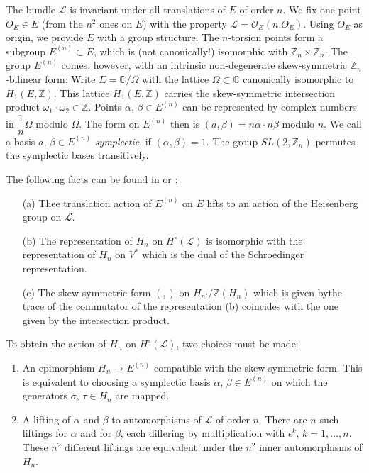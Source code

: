 The bundle $\mathscr{L}$ is invariant under all translations of $E$ of
order $n$. We fix one point $O_{E}\in E$ (from the $n^{2}$ ones on
$E$) with the property $\mathscr{L}=\mathscr{O}_{E}(n.O_{E})$. Using
$O_{E}$ as origin, we provide $E$ with a group structure. The
$n$-torsion points form a subgroup $E^{(n)}\subset E$, which is (not
canonically!) isomorphic with
$\mathbb{Z}_{n}\times \mathbb{Z}_{n}$. The group $E^{(n)}$ comes,
however, with an intrinsic non-degenerate skew-symmetric
$\mathbb{Z}_{n}$-bilinear form: Write $E=\mathbb{C}/\Omega$ with the
lattice $\Omega\subset \mathbb{C}$ canonically isomorphic to
$H_{1}(E,\mathbb{Z})$. This lattice $H_{1}(E,\mathbb{Z})$ carries the
skew-symmetric intersection product
$\omega_{1}\cdot \omega_{2}\in \mathbb{Z}$. Points $\alpha$, $\beta\in
E^{(n)}$ can be represented by complex numbers in $\dfrac{1}{n}\Omega$
modulo $\Omega$. The form on $E^{(n)}$ then is $(a,\beta)=n\alpha\cdot
n\beta$ modulo $n$. We call a basis $a$, $\beta\in E^{(n)}$ {\em
symplectic}, if $(\alpha,\beta)=1$. The group $SL(2,\mathbb{Z}_{n})$
permutes the symplectic bases transitively.

The following facts can be found in \cite{chap2-key8} or \cite[chapter
1]{chap2-key7}: 
\begin{itemize}
\item[(a)] Thee translation action of $E^{(n)}$ on $E$ lifts to an
action of the Heisenberg group on $\mathscr{L}$.

\item[(b)] The representation of $H_{n}$ on $H^{\circ}(\mathscr{L})$
is isomorphic with the representation of $H_{n}$ on $V^{*}$ which is
the dual of the Schroedinger representation.

\item[(c)] The skew-symmetric form $(,)$ on $H_{n'}/\mathbb{Z}(H_{n})$
which is given by\pageoriginale the trace of the commutator of the
representation (b) coincides with the one given by the intersection
product. 
\end{itemize}

To obtain the action of $H_{n}$ on $H^{\circ}(\mathscr{L})$, two
choices must be made:
\begin{enumerate}
\item An epimorphism $H_{n}\to E^{(n)}$ compatible with the
skew-symmetric form. This is equivalent to choosing a symplectic basis
$\alpha$, $\beta\in E^{(n)}$ on which the generators $\sigma$,
$\tau\in H_{n}$ are mapped.

\item A lifting of $\alpha$ and $\beta$ to automorphisms of
$\mathscr{L}$ of order $n$. There are $n$ such liftings for $\alpha$
and for $\beta$, each differing by multiplication with $\epsilon^{k}$,
$k=1,\ldots,n$. These $n^{2}$ different liftings are equivalent under
the $n^{2}$ inner automorphisms of $H_{n}$.
\end{enumerate}

